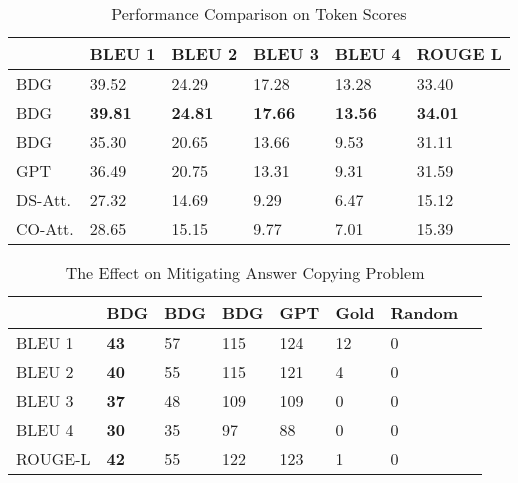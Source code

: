 \documentclass[11pt,a4paper]{article}
\begin{document}
\begin{table*}
\centering
    \begin{tabular}{|l|l|l|l|l|l|}
    \hline
                          & BLEU 1         & BLEU 2         & BLEU 3         & BLEU 4        & ROUGE L         \\ 
    \hline
    BDG  & 39.52    & 24.29 & 17.28 & 13.28 & 33.40           \\ 
    \hline
    BDG     & \textbf{39.81}          & \textbf{24.81}          & \textbf{17.66}          & \textbf{13.56}          & \textbf{34.01}  \\ 
    \hline
BDG                   & 35.30          & 20.65          & 13.66          & 9.53          & 31.11           \\ 
    \hline
    GPT                   & 36.49          & 20.75          & 13.31          & 9.31          & 31.59           \\ 
    \hline
    DS-Att.               & 27.32          & 14.69          & 9.29           & 6.47          & 15.12           \\ 
    \hline
    CO-Att.               & 28.65          & 15.15          & 9.77           & 7.01          & 15.39           \\
    \hline
    \end{tabular}
    \caption{Performance Comparison on Token Scores}
    \label{tab:toke_score_overview}
\end{table*}

\begin{table*}
    \centering
    \begin{tabular}{|l|l|l|l|l|l|l|l|} 
\hline
               & BDG  & BDG    & BDG & GPT & Gold & Random  \\ 
\hline
BLEU 1   & \textbf{43}           & 57                        & 115 & 124 & 12   & 0       \\ 
\hline
BLEU 2   & \textbf{40}           & 55                         & 115 & 121 & 4   & 0       \\ 
\hline
BLEU 3   & \textbf{37}           & 48                        & 109 & 109 & 0    & 0       \\ 
\hline
BLEU 4   & \textbf{30}           & 35                        & 97  & 88  & 0    & 0       \\ 
\hline
ROUGE-L & \textbf{42}           & 55                      & 122 & 123 & 1    & 0       \\
\hline
\end{tabular}
    \caption{The Effect on Mitigating Answer Copying Problem}
\label{tab:repeating-problem}
\end{table*} 
\end{document}
